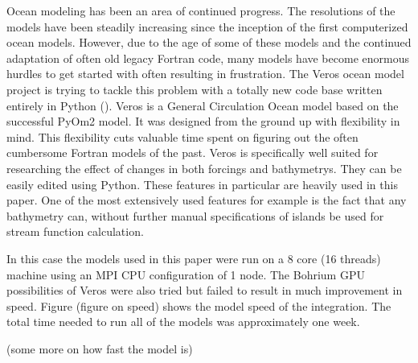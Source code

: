 Ocean modeling has been an area of continued progress. The resolutions of the models have been steadily increasing since the inception of the first computerized ocean models. However, due to the age of some of these models and the continued adaptation of often old legacy Fortran code, many models have become enormous hurdles to get started with often resulting in frustration. The Veros ocean model project is trying to tackle this problem with a totally new code base written entirely in Python (\cite{Hafner2018Aug}). 
Veros is a General Circulation Ocean model based on the successful PyOm2 model. It was designed from the ground up with flexibility in mind. This flexibility cuts valuable time spent on figuring out the often cumbersome Fortran models of the past. Veros is specifically well suited for researching the effect of changes in both forcings and bathymetrys. They can be easily edited using Python. These features in particular are heavily used in this paper. One of the most extensively used features for example is the fact that any bathymetry can, without further manual specifications of islands be used for stream function calculation.

In this case the models used in this paper were run on a 8 core (16 threads) machine using an MPI CPU configuration of 1 node. The Bohrium GPU possibilities of Veros were also tried but failed to result in much improvement in speed. Figure (figure on speed) shows the model speed of the integration. The total time needed to run all of the models was approximately one week.

(some more on how fast the model is)